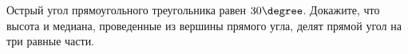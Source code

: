 \begin{ex}
	\begin{condition}
		Острый угол прямоугольного треугольника равен \( 30\degree \). Докажите, что высота и медиана, проведенные из вершины прямого угла, делят прямой угол на три равные части.
	\end{condition}
\end{ex}